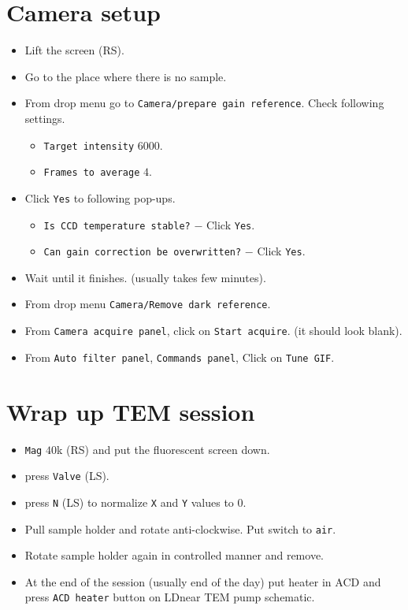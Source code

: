 \documentclass[letterpaper,12pt]{article}
\begin{document}
\section{Camera setup}
\begin{itemize}
\item Lift the screen (RS\footnotemark[1]).
\item Go to the place where there is no sample.
\item From drop menu go to \texttt{Camera/prepare gain reference}. Check following settings.
\begin{itemize}
\item \texttt{Target intensity} $6000$.
\item \texttt{Frames to average} $4$.
\end{itemize}
\item Click \texttt{Yes} to following pop-ups.
\begin{itemize}
\item \texttt{Is CCD temperature stable?} $-$ Click \texttt{Yes}.
\item \texttt{Can gain correction be overwritten?} $-$ Click \texttt{Yes}.
\end{itemize}
\item Wait until it finishes. (usually takes few minutes).
\item From drop menu \texttt{Camera/Remove dark reference}.
\item From \texttt{Camera acquire panel}, click on \texttt{Start acquire}. (it should look blank).
\item From \texttt{Auto filter panel}, \texttt{Commands panel}, Click on \texttt{Tune GIF}.
\end{itemize}

\section{Wrap up TEM session}
\begin{itemize}
\item \texttt{Mag} $40$k (RS\footnotemark[1]) and put the fluorescent screen down.
\item press \texttt{Valve} (LS\footnotemark[1]).
\item press \texttt{N} (LS\footnotemark[1]) to normalize \texttt{X} and \texttt{Y} values to $0$.
\item Pull sample holder and rotate anti-clockwise. Put switch to \texttt{air}. 
\item Rotate sample holder again in controlled manner and remove.
\item At the end of the session (usually end of the day) put heater in ACD and press \texttt{ACD heater} button on LD\footnotemark[1] near TEM pump schematic.
\end{itemize}
\end{document}
